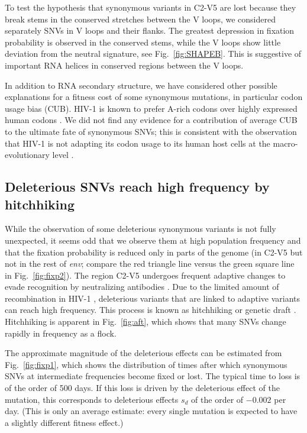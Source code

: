 \documentclass[11pt]{article}
\newcommand{\FIG}[1]{Fig.~\ref{fig:#1}}
\newcommand{\env}{\textit{env}}
\newcommand{\shankaregion}{C2-V5}
\begin{document}
To test the hypothesis that synonymous variants in \shankaregion{} are lost because they
break stems in the conserved stretches between the V loops, we considered
separately SNVs in V loops and their flanks. The greatest
depression in fixation probability is observed in the conserved stems, while the
V loops show little deviation from the neutral signature, see
\FIG{SHAPEB}. This is suggestive of important RNA helices in conserved
regions between the V loops.

In addition to RNA secondary structure, we have considered other possible
explanations for a fitness cost of some synonymous mutations, in particular
codon usage bias (CUB). HIV-1 is known to prefer A-rich codons over highly
expressed human codons \citep{jenkins_extent_2003, kuyl_biased_2012}. We
did not find any evidence for a contribution of average CUB to the ultimate
fate of synonymous SNVs; this is consistent with the observation that HIV-1 is not
adapting its codon usage to its human host cells at the macro-evolutionary level
\citep{kuyl_biased_2012}.


\subsection*{Deleterious SNVs reach high frequency by hitchhiking}
While the observation of some deleterious synonymous variants is not fully
unexpected, it seems odd that we observe them at high population
frequency and that the fixation probability is reduced only in parts of the
genome (in \shankaregion{} but not in the rest of \env{}; compare the red
triangle line versus the green square line in \FIG{fixp2}).
The region \shankaregion{} undergoes frequent adaptive changes to evade
recognition by neutralizing antibodies \cite{williamson_adaptation_2003,
richman_rapid_2003}. Due to the limited amount of recombination in HIV-1
\cite{neher_recombination_2010, batorsky_estimate_2011}, deleterious variants
that are linked to adaptive variants can reach high frequency. This process is
known as hitchhiking \citep{smith_hitch-hiking_1974} or genetic draft
\citep{gillespie_genetic_2000,neher_genetic_2011}. Hitchhiking is apparent in
\FIG{aft}, which shows that many SNVs change rapidly in frequency as a
flock. 

The approximate magnitude of the deleterious effects can be estimated from
\FIG{fixp1}, which shows the distribution of times after which synonymous
SNVs at intermediate frequencies become fixed or lost. The typical time to
loss is of the order of 500 days. If this loss is driven by the deleterious
effect of the mutation, this corresponds to deleterious effects $s_d$ of the
order of $- 0.002$ per day. (This is only an average estimate: every single
mutation is expected to have a slightly different fitness effect.)
\end{document}
